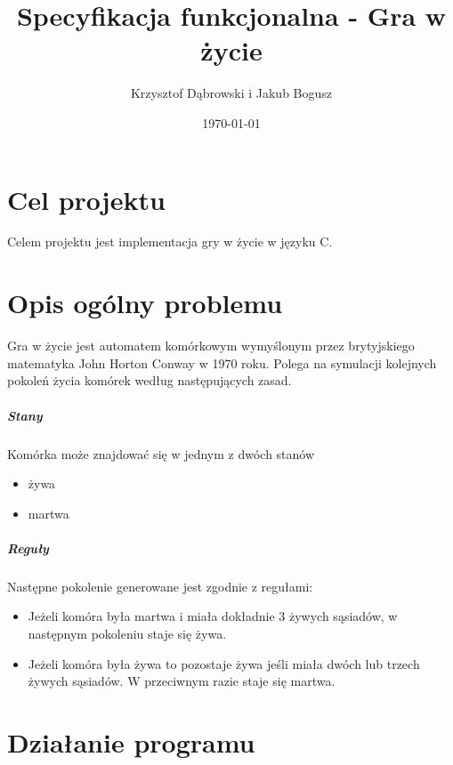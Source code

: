 \documentclass{report}
\title{Specyfikacja funkcjonalna - Gra w życie}
\author{Krzysztof Dąbrowski i Jakub Bogusz}
\date{\today}
\begin{document}
\maketitle{}

\tableofcontents{}

\chapter{Cel projektu}
Celem projektu jest implementacja gry w życie w języku C.

\chapter{Opis ogólny problemu}
Gra w życie jest automatem komórkowym wymyślonym przez brytyjskiego matematyka John Horton Conway %
w 1970 roku. Polega na symulacji kolejnych pokoleń życia komórek według następujących zasad.


\paragraph{Stany}  Komórka może znajdować się w jednym z dwóch stanów
\begin{itemize}
\item żywa
\item martwa
\end{itemize}

\paragraph{Reguły} Następne pokolenie generowane jest zgodnie z regułami:
\begin{itemize}
\item Jeżeli komóra była martwa i miała dokładnie 3 żywych sąsiadów, w następnym pokoleniu staje się żywa.
\item Jeżeli komóra była żywa to pozostaje żywa jeśli miała dwóch lub trzech żywych sąsiadów. W przeciwnym razie staje się martwa.
\end{itemize}

\chapter{Działanie programu}
\end{document}
